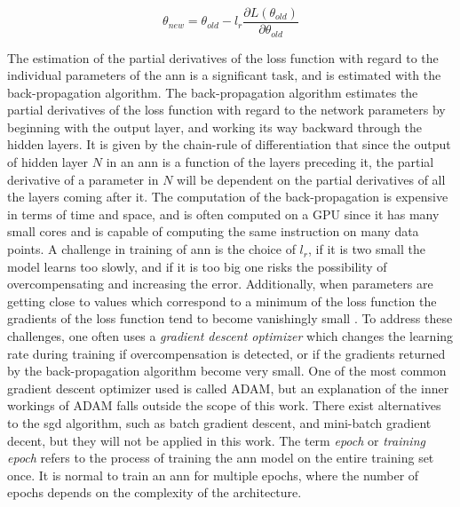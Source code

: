 \begin{equation}
    \theta_{new} = \theta_{old} - l_r \frac{\partial L(\theta_{old})}{\partial \theta_{old}}
    \label{eq:sgd}
\end{equation}

The estimation of the partial derivatives of the loss function with regard to the individual parameters of the \acrshort{ann} is a significant task, and is estimated with the back-propagation algorithm. The back-propagation algorithm estimates the partial derivatives of the loss function with regard to the network parameters by beginning with the output layer, and working its way backward through the hidden layers. It is given by the chain-rule of differentiation that since the output of hidden layer $N$ in an \acrshort{ann} is a function of the layers preceding it, the partial derivative of a parameter in $N$ will be dependent on the partial derivatives of all the layers coming after it. The computation of the back-propagation is expensive in terms of time and space, and is often computed on a GPU since it has many small cores and is capable of computing the same instruction on many data points. A challenge in training of \acrshort{ann} is the choice of $l_r$, if it is two small the model learns too slowly, and if it is too big one risks the possibility of overcompensating and increasing the error. Additionally, when parameters are getting close to values which correspond to a minimum of the loss function the gradients of the loss function tend to become vanishingly small \cite{dl_book}. To address these challenges, one often uses a \textit{gradient descent optimizer} which changes the learning rate during training if overcompensation is detected, or if the gradients returned by the back-propagation algorithm become very small. One of the most common gradient descent optimizer used is called ADAM, but an explanation of the inner workings of ADAM falls outside the scope of this work. There exist alternatives to the \acrshort{sgd} algorithm, such as batch gradient descent, and mini-batch gradient decent, but they will not be applied in this work. The term \textit{epoch} or \textit{training epoch} refers to the process of training the \acrshort{ann} model on the entire training set once. It is normal to train an \acrshort{ann} for multiple epochs, where the number of epochs depends on the complexity of the architecture.  

